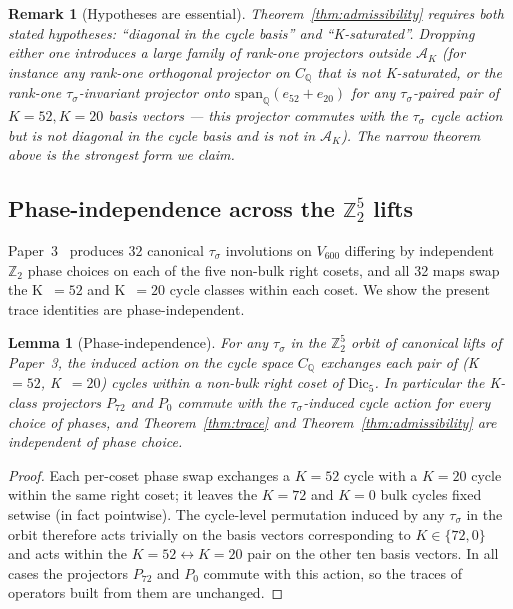 \documentclass[11pt]{article}
\newtheorem{lemma}{Lemma}[section]
\newtheorem{remark}{Remark}[section]
\newcommand{\Vsixhundred}{V_{600}}
\newcommand{\Dicfive}{\mathrm{Dic}_5}
\newcommand{\CQ}{C_{\mathbb{Q}}}
\newcommand{\PK}[1]{P_{#1}}
\begin{document}
\begin{remark}[Hypotheses are essential]\label{rem:hyp}
Theorem~\ref{thm:admissibility} requires both stated hypotheses:
``diagonal in the cycle basis'' and ``K-saturated''. Dropping either
one introduces a large family of rank-one projectors outside
$\mathcal{A}_K$ (for instance any rank-one orthogonal projector on
$\CQ$ that is not K-saturated, or the rank-one $\tau_\sigma$-invariant
projector onto $\mathrm{span}_{\mathbb{Q}}(e_{52} + e_{20})$ for any
$\tau_\sigma$-paired pair of $K=52, K=20$ basis vectors --- this
projector commutes with the $\tau_\sigma$ cycle action but is not
diagonal in the cycle basis and is not in $\mathcal{A}_K$). The
narrow theorem above is the strongest form we claim.
\end{remark}

\subsection{Phase-independence across the $\mathbb{Z}_2^5$ lifts}

Paper~3~\citep{V600Paper3} produces $32$ canonical $\tau_\sigma$
involutions on $\Vsixhundred$ differing by independent
$\mathbb{Z}_2$ phase choices on each of the five non-bulk right
cosets, and all 32 maps swap the K~$=52$ and K~$=20$ cycle classes
within each coset. We show the present trace identities are
phase-independent.

\begin{lemma}[Phase-independence]\label{lem:phaseind}
For any $\tau_\sigma$ in the $\mathbb{Z}_2^5$ orbit of canonical lifts
of Paper~3, the induced action on the cycle space $\CQ$ exchanges
each pair of (K~$=52$, K~$=20$) cycles within a non-bulk right coset
of $\Dicfive$. In particular the K-class projectors $\PK{72}$ and
$\PK{0}$ commute with the $\tau_\sigma$-induced cycle action for
every choice of phases, and Theorem~\ref{thm:trace} and
Theorem~\ref{thm:admissibility} are independent of phase choice.
\end{lemma}

\begin{proof}
Each per-coset phase swap exchanges a $K=52$ cycle with a $K=20$
cycle within the same right coset; it leaves the $K=72$ and $K=0$
bulk cycles fixed setwise (in fact pointwise). The cycle-level
permutation induced by any $\tau_\sigma$ in the orbit therefore acts
trivially on the basis vectors corresponding to $K \in \{72, 0\}$
and acts within the $K = 52 \leftrightarrow K = 20$ pair on the
other ten basis vectors. In all cases the projectors $\PK{72}$ and
$\PK{0}$ commute with this action, so the traces of operators built
from them are unchanged.
\end{proof}
\end{document}
